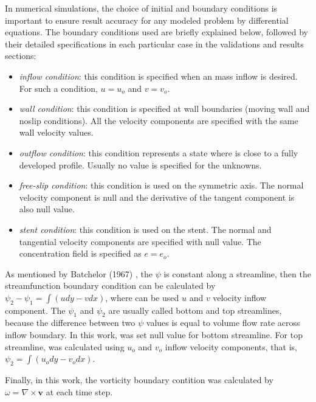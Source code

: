 In numerical simulations, the choice of initial and boundary conditions
is important to ensure result accuracy for any modeled problem 
by differential equations. 
The boundary conditions used
are briefly explained below, 
followed by their detailed specifications 
in each particular case in the validations and results sections:

\begin{itemize}
 \item \textit{inflow condition}:
 this condition is specified when an mass inflow is desired.
 For such a condition, $u = u_{o}$
 and $v = v_{o}$.

 \item \textit{wall condition}:
 this condition is specified at wall boundaries (moving wall
 and noslip conditions).
 All the velocity components are specified with 
 the same wall velocity values.

 \item \textit{outflow condition}: 
 this condition represents a state where is close to a
 fully developed profile.
 Usually no value is specified for the unknowns.

 \item \textit{free-slip condition}: 
 this condition is used on the symmetric axis.
 The normal velocity component is null and the derivative of
 the tangent component is also null value.

 \item \textit{stent condition}: 
 this condition is used on the stent. The normal and tangential
 velocity components are specified with null value. 
 The concentration field is specified as $e=e_{o}$.
\end{itemize}

As mentioned by Batchelor (1967) \cite{batchelor1967},
the $\psi$ is constant along a streamline, then
the streamfunction boundary condition can be calculated by
$\psi_{2} - \psi_{1} = \int \left(udy - vdx\right)$,
where can be used $u$ and $v$ velocity inflow component.
The $\psi_{1}$ and $\psi_{2}$ are usually called 
bottom and top streamlines, because the difference
between two $\psi$ values is equal to volume flow
rate across inflow boundary. In this work, was set
null value for bottom streamline. For top streamline,
was calculated using $u_{o}$ and $v_{o}$ inflow velocity
components, that is, $\psi_{2} = \int \left(u_{o}dy - v_{o}dx\right)$.

\medskip
Finally, in this work, the vorticity boundary contition
was calculated by $\omega = \nabla \times \textbf{v}$
at each time step.
